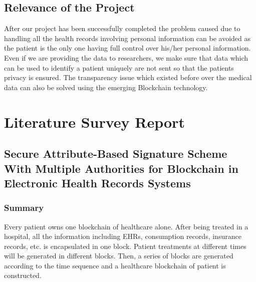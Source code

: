\documentclass[11pt]{report}
\begin{document}
\section{Relevance of the Project}

After our project has been successfully completed the problem caused due to handling all the health records involving personal information can be avoided as the patient is the only one having full control over his/her personal information. Even if we are providing the data to researchers, we make sure that data which can be used to identify a patient uniquely are not sent so that the patients privacy is ensured. The transparency issue which existed before over the medical data can also be solved using the emerging Blockchain technology.



\chapter{Literature Survey Report}  

\section{Secure Attribute-Based Signature Scheme With Multiple Authorities for Blockchain in Electronic Health Records Systems \cite{1}}
 
\subsection{Summary}
Every patient owns one blockchain of healthcare alone. After being treated in a hospital, all the information including EHRs, consumption records, insurance records, etc. is encapsulated in one block. Patient treatments at different times will be generated in different blocks. Then, a series of blocks are generated according to the time sequence and a healthcare blockchain of patient is constructed.
\end{document}
